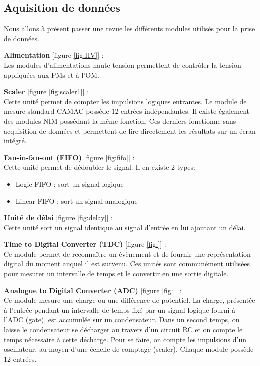 \FloatBarrier

\subsection{Aquisition de donn{\'e}es}
Nous allons à présent passer une revue les différents modules utilisés pour la prise de données.

\textbf{Alimentation} [figure \ref{fig:HV}] :\\
Les modules d'alimentations haute-tension permettent de contrôler la tension appliquées aux PMs et à l'OM.

\textbf{Scaler} [figure \ref{fig:scaler1}] :\\
Cette unité permet de compter les impulsions logiques entrantes. Le module de mesure standard CAMAC possède 12 entrées indépendantes. Il existe également des modules NIM possédant la même fonction. Ces derniers fonctionne sans acquisition de données et permettent de lire directement les résultats sur un écran intégré.

\textbf{Fan-in-fan-out (FIFO)} [figure  \ref{fig:fifo}] :\\
Cette unité permet de dédoubler le signal. Il en existe 2 types:
\begin{itemize}
\item Logic FIFO : sort un signal logique
\item Linear FIFO : sort un signal analogique
\end{itemize}

\textbf{Unité de délai} [figure \ref{fig:delay}] :\\
Cette unité sort un signal identique au signal d'entrée en lui ajoutant un délai.

\textbf{Time to Digital Converter (TDC)} [figure \ref{fig:}] :\\
Ce module permet de reconnaître un évènement et de fournir une représentation digital du moment auquel il est survenu. Ces unités sont communément utilisées pour mesurer un intervalle de temps et le convertir en une sortie digitale.

\textbf{Analogue to Digital Converter (ADC)} [figure \ref{fig:}] :\\
Ce module mesure une charge ou une différence de potentiel. 
La charge, présentée à l’entrée pendant un intervalle de temps fixé par un signal logique fourni à l’ADC (gate), est accumulée sur un condensateur. Dans un second temps, on laisse le condensateur se décharger au travers d’un circuit RC et on compte le temps nécessaire à cette décharge. Pour se faire, on compte les impulsions d’un oscillateur, au moyen d’une échelle de comptage (scaler). Chaque module possède 12 entrées.

